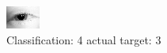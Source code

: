 \begin{figure}[h!]
\begin{center}
\includegraphics[width=0.60\columnwidth]{figures/ID101_class_4_target_3.png}
\end{center}
\caption{ Classification: 4 actual target: 3}
\label{fig:ID101_class_4_target_3}
\end{figure}
